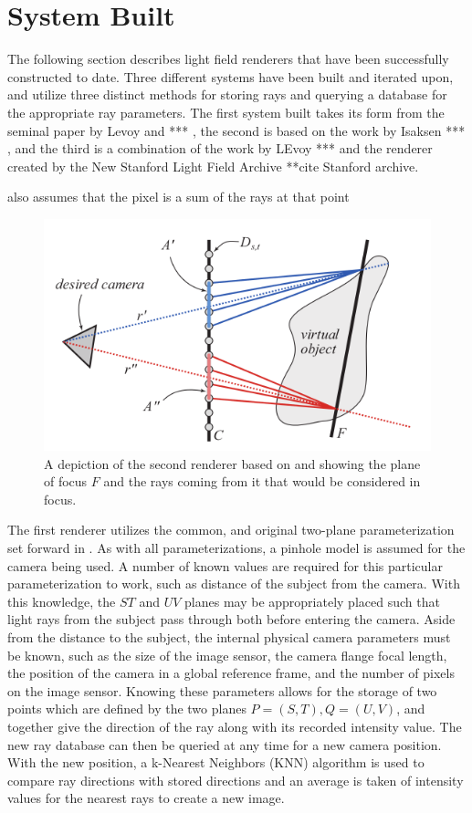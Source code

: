 \documentclass[12pt]{report}
\begin{document}
\section{System Built}
The following section describes light field renderers that have been successfully constructed to date. Three different systems have been built and iterated upon, and utilize three distinct methods for storing rays and querying a database for the appropriate ray parameters. The first system built takes its form from the seminal paper by Levoy and *** \cite{Levoy96}, the second is based on the work by Isaksen *** \cite{Isaksen01}, and the third is a combination of the work by LEvoy *** and the renderer created by the New Stanford Light Field Archive \cite{lfArchive} **cite Stanford archive.

also assumes that the pixel is a sum of the rays at that point

\begin{figure}[!ht]
	\centering
	\includegraphics[scale=0.7]{mobile_focus.png}
	\caption{A depiction of the second renderer based on \cite{Isaksen01} and showing the plane of focus $F$ and the rays coming from it that would be considered in focus.}
	\label{fig:mobile_focus}
\end{figure}
The first renderer utilizes the common, and original two-plane parameterization set forward in \cite{Levoy96}. As with all parameterizations, a pinhole model is assumed for the camera being used. A number of known values are required for this particular parameterization to work, such as distance of the subject from the camera. With this knowledge, the $ST$ and $UV$ planes may be appropriately placed such that light rays from the subject pass through both before entering the camera. Aside from the distance to the subject, the internal physical camera parameters must be known, such as the size of the image sensor, the camera flange focal length, the position of the camera in a global reference frame, and the number of pixels on the image sensor. Knowing these parameters allows for the storage of two points which are defined by the two planes $P=(S,T), Q=(U,V)$, and together give the direction of the ray along with its recorded intensity value. The new ray database can then be queried at any time for a new camera position. With the new position, a k-Nearest Neighbors (KNN) algorithm is used to compare ray directions with stored directions and an average is taken of intensity values for the nearest rays to create a new image.
\end{document}
